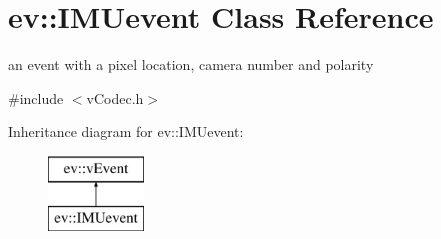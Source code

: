 \hypertarget{classev_1_1IMUevent}{}\section{ev\+:\+:I\+M\+Uevent Class Reference}
\label{classev_1_1IMUevent}


an event with a pixel location, camera number and polarity  




{\ttfamily \#include $<$v\+Codec.\+h$>$}

Inheritance diagram for ev\+:\+:I\+M\+Uevent\+:\begin{figure}[H]
\begin{center}
\leavevmode
\includegraphics[height=2.000000cm]{classev_1_1IMUevent}
\end{center}
\end{figure}
